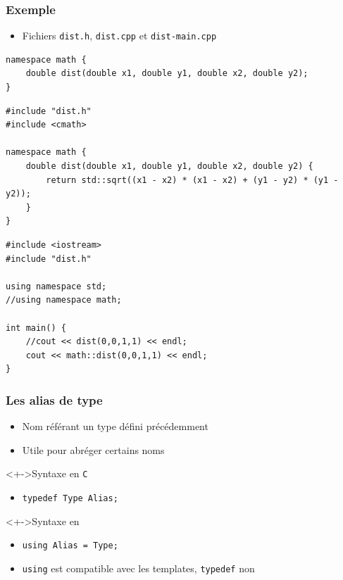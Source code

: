 \begin{frame}[containsverbatim]
\frametitle{Exemple}
\begin{itemize}
\item Fichiers \texttt{dist.h}, \texttt{dist.cpp} et \texttt{dist-main.cpp}
\end{itemize}
\begin{lstlisting}
namespace math {
	double dist(double x1, double y1, double x2, double y2);	
}
\end{lstlisting}
\begin{lstlisting}
#include "dist.h"
#include <cmath>

namespace math {
	double dist(double x1, double y1, double x2, double y2)	{
		return std::sqrt((x1 - x2) * (x1 - x2) + (y1 - y2) * (y1 - y2));
	}
}
\end{lstlisting}
\begin{lstlisting}
#include <iostream>
#include "dist.h"

using namespace std;
//using namespace math;

int main() {
	//cout << dist(0,0,1,1) << endl;
	cout << math::dist(0,0,1,1) << endl;
}
\end{lstlisting}
\end{frame}

\begin{frame}
\frametitle{Les alias de type}
\begin{itemize}[<+->]
\item Nom référant un type défini précédemment
\item Utile pour abréger certains noms
\end{itemize}
\begin{exampleblock}<+->{Syntaxe en \texttt{C}}
	\begin{itemize}[<+->]
	\item \lstinline|typedef Type Alias;|
	\end{itemize}
\end{exampleblock}
\begin{exampleblock}<+->{Syntaxe en \cpp}
	\begin{itemize}[<+->]
	\item \lstinline|using Alias = Type;|
	\end{itemize}
\end{exampleblock}
\begin{itemize}[<+->]
\item \lstinline|using| est compatible avec les templates, \lstinline|typedef| non
\end{itemize}
\end{frame}

